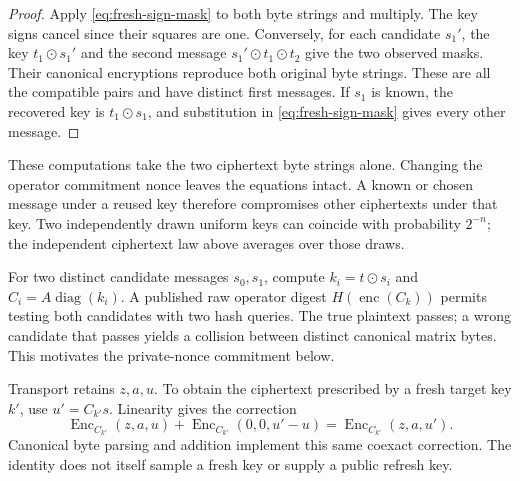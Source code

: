 \begin{proof}
Apply \eqref{eq:fresh-sign-mask} to both byte strings and multiply. The key
signs cancel since their squares are one. Conversely, for each candidate
\(s_1'\), the key \(t_1\mathbin\odot s_1'\) and the second message
\(s_1'\mathbin\odot t_1\mathbin\odot t_2\) give the two observed masks.
Their canonical encryptions reproduce both original byte strings. These
are all the compatible pairs and have distinct first messages. If \(s_1\)
is known, the recovered key is \(t_1\mathbin\odot s_1\), and substitution
in \eqref{eq:fresh-sign-mask} gives every other message.
\end{proof}

These computations take the two ciphertext byte strings alone. Changing
the operator commitment nonce leaves the equations intact. A known or
chosen message under a reused key therefore compromises other ciphertexts
under that key. Two independently drawn uniform keys can coincide with
probability \(2^{-n}\); the independent ciphertext law above averages over
those draws.

For two distinct candidate messages \(s_0,s_1\), compute
\(k_i=t\mathbin\odot s_i\) and \(C_i=A\operatorname{diag}(k_i)\).
A published raw operator digest \(H(\operatorname{enc}(C_k))\) permits testing both
candidates with two hash queries. The true plaintext passes; a wrong
candidate that passes yields a collision between distinct canonical matrix
bytes. This motivates the private-nonce commitment below.

Transport retains \(z,a,u\). To obtain the ciphertext prescribed by a
fresh target key \(k'\), use \(u'=C_{k'}s\). Linearity gives the correction
\[
 \operatorname{Enc}_{C_{k'}}(z,a,u)
 +\operatorname{Enc}_{C_{k'}}(0,0,u'-u)
 =\operatorname{Enc}_{C_{k'}}(z,a,u').
\]
Canonical byte parsing and addition implement this same coexact correction.
The identity does not itself sample a fresh key or supply a public refresh
key.



